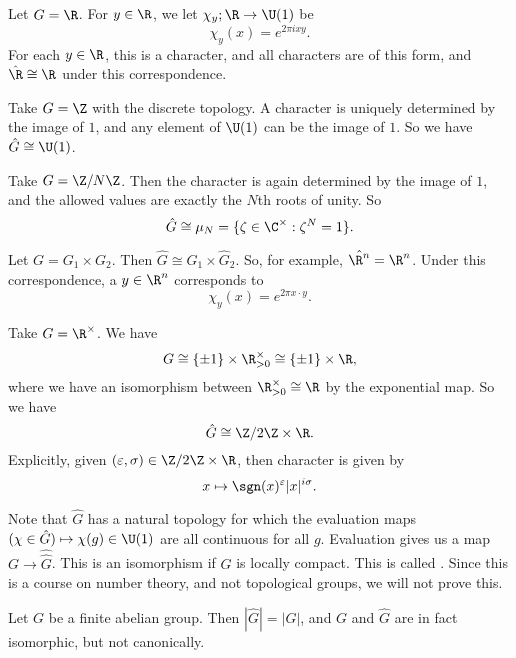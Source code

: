 \documentclass[a4paper]{article}
\begin{document}
\begin{eg}
  Let $G = \R$. For $y \in \R$, we let $\chi_y; \R \to \U(1)$ be
  \[
    \chi_y(x) = e^{2\pi i xy}.
  \]
  For each $y \in \R$, this is a character, and all characters are of this form, and $\hat{\R} \cong \R$ under this correspondence.
\end{eg}

\begin{eg}
  Take $G = \Z$ with the discrete topology. A character is uniquely determined by the image of $1$, and any element of $\U(1)$ can be the image of $1$. So we have $\hat{G} \cong \U(1)$.
\end{eg}

\begin{eg}
  Take $G = \Z/N\Z$. Then the character is again determined by the image of $1$, and the allowed values are exactly the $N$th roots of unity. So
  \[
    \hat{G} \cong \mu_N = \{\zeta \in \C^\times: \zeta^N = 1\}.
  \]
\end{eg}

\begin{eg}
  Let $G = G_1 \times G_2$. Then $\hat{G} \cong \hat{G}_1 \times \hat{G}_2$. So, for example, $\hat{\R^n} = \R^n$. Under this correspondence, a $y \in \R^n$ corresponds to
  \[
    \chi_y(x) = e^{2\pi x\cdot y}.
  \]
\end{eg}

\begin{eg}
  Take $G = \R^\times$. We have
  \[
    G \cong \{\pm 1\} \times \R^\times_{>0} \cong \{\pm 1\} \times \R,
  \]
  where we have an isomorphism between $\R^{\times}_{> 0} \cong \R$ by the exponential map. So we have
  \[
    \hat{G} \cong \Z/2\Z \times \R.
  \]
  Explicitly, given $(\varepsilon, \sigma) \in \Z/2\Z \times \R$, then character is given by
  \[
    x \mapsto \sgn(x)^\varepsilon |x|^{i\sigma}.
  \]
\end{eg}

Note that $\hat{G}$ has a natural topology for which the evaluation maps $(\chi \in \hat{G}) \mapsto \chi(g) \in \U(1)$ are all continuous for all $g$. Evaluation gives us a map $G \to \hat{\hat{G}}$. This is an isomorphism if $G$ is locally compact. This is called . Since this is a course on number theory, and not topological groups, we will not prove this.

\begin{prop}
  Let $G$ be a finite abelian group. Then $|\hat{G}| = |G|$, and $G$ and $\hat{G}$ are in fact isomorphic, but not canonically.
\end{prop}
\end{document}
